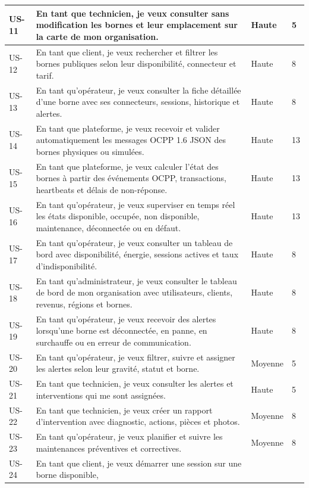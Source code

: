\begin{longtable}{|C{1.25cm}|p{10.25cm}|C{1.65cm}|C{1.0cm}|}
  US-11 & En tant que technicien, je veux consulter sans modification les bornes et
  leur emplacement sur la carte de mon organisation. & Haute & 5\\\hline
  US-12 & En tant que client, je veux rechercher et filtrer les bornes publiques selon
  leur disponibilité, connecteur et tarif. & Haute & 8\\\hline
  US-13 & En tant qu'opérateur, je veux consulter la fiche détaillée d'une borne avec
  ses connecteurs, sessions, historique et alertes. & Haute & 8\\\hline
  US-14 & En tant que plateforme, je veux recevoir et valider automatiquement les
  messages OCPP 1.6 JSON des bornes physiques ou simulées. & Haute & 13\\\hline
  US-15 & En tant que plateforme, je veux calculer l'état des bornes à partir des
  événements OCPP, transactions, heartbeats et délais de non-réponse. & Haute & 13\\\hline
  US-16 & En tant qu'opérateur, je veux superviser en temps réel les états disponible,
  occupée, non disponible, maintenance, déconnectée ou en défaut. & Haute & 13\\\hline
  US-17 & En tant qu'opérateur, je veux consulter un tableau de bord avec disponibilité,
  énergie, sessions actives et taux d'indisponibilité. & Haute & 8\\\hline
  US-18 & En tant qu'administrateur, je veux consulter le tableau de bord de mon
  organisation avec utilisateurs, clients, revenus, régions et bornes. & Haute & 8\\\hline
  US-19 & En tant qu'opérateur, je veux recevoir des alertes lorsqu'une borne est
  déconnectée, en panne, en surchauffe ou en erreur de communication. & Haute & 8\\\hline
  US-20 & En tant qu'opérateur, je veux filtrer, suivre et assigner les alertes selon
  leur gravité, statut et borne. & Moyenne & 5\\\hline
  US-21 & En tant que technicien, je veux consulter les alertes et interventions qui
  me sont assignées. & Haute & 5\\\hline
  US-22 & En tant que technicien, je veux créer un rapport d'intervention avec
  diagnostic, actions, pièces et photos. & Moyenne & 8\\\hline
  US-23 & En tant qu'opérateur, je veux planifier et suivre les maintenances
  préventives et correctives. & Moyenne & 8\\\hline
  US-24 & En tant que client, je veux démarrer une session sur une borne disponible,

\end{longtable}
